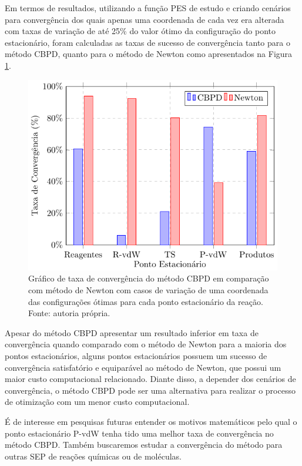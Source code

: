 \documentclass{pssbmac}
\begin{document}
Em termos de resultados, utilizando a função PES de estudo e criando cenários para convergência dos quais apenas uma coordenada de cada vez era alterada com taxas de variação de até 25\% do valor ótimo da configuração do ponto estacionário, foram calculadas as taxas de sucesso de convergência tanto para o método CBPD, quanto para o método de Newton como apresentados na Figura \ref{figura01}.
%
\begin{figure}[H]
\centering
\includegraphics[width=.425\textwidth]{image}
\caption{ {\small Gráfico de taxa de convergência do método CBPD em comparação com método de Newton com casos de variação de uma coordenada das configurações ótimas para cada ponto estacionário da reação. Fonte: autoria própria.}}
\label{figura01}
\end{figure}
%
Apesar do método CBPD apresentar um resultado inferior em taxa de convergência quando comparado com o método de Newton para a maioria dos pontos estacionários, alguns pontos estacionários possuem um sucesso de convergência satisfatório e equiparável ao método de Newton, que possui um maior custo computacional relacionado. Diante disso, a depender dos cenários de convergência, o método CBPD pode ser uma alternativa para realizar o processo de otimização com um menor custo computacional.

É de interesse em pesquisas futuras entender os motivos matemáticos pelo qual o ponto estacionário P-vdW tenha tido uma melhor taxa de convergência no método CBPD. Também buscaremos estudar a convergência do método para outras SEP de reações químicas ou de moléculas.

\printbibliography
\end{document}
